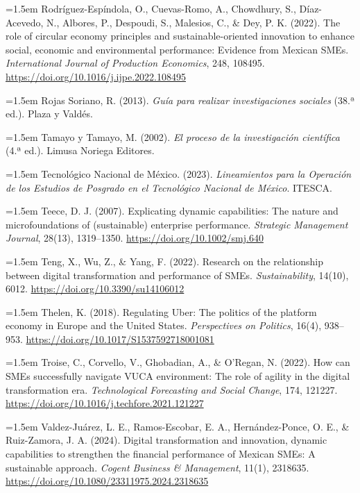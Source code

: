 {\hangindent=1.5em Rodríguez-Espíndola, O., Cuevas-Romo, A., Chowdhury, S., Díaz-Acevedo, N., Albores, P., Despoudi, S., Malesios, C., \& Dey, P. K. (2022). The role of circular economy principles and sustainable-oriented innovation to enhance social, economic and environmental performance: Evidence from Mexican SMEs. \textit{International Journal of Production Economics}, 248, 108495. \url{https://doi.org/10.1016/j.ijpe.2022.108495}

\hangindent=1.5em Rojas Soriano, R. (2013). \textit{Guía para realizar investigaciones sociales} (38.ª ed.). Plaza y Valdés.

\hangindent=1.5em Tamayo y Tamayo, M. (2002). \textit{El proceso de la investigación científica} (4.ª ed.). Limusa Noriega Editores.

\hangindent=1.5em Tecnológico Nacional de México. (2023). \textit{Lineamientos para la Operación de los Estudios de Posgrado en el Tecnológico Nacional de México}. ITESCA.

\hangindent=1.5em Teece, D. J. (2007). Explicating dynamic capabilities: The nature and microfoundations of (sustainable) enterprise performance. \textit{Strategic Management Journal}, 28(13), 1319--1350. \url{https://doi.org/10.1002/smj.640}

\hangindent=1.5em Teng, X., Wu, Z., \& Yang, F. (2022). Research on the relationship between digital transformation and performance of SMEs. \textit{Sustainability}, 14(10), 6012. \url{https://doi.org/10.3390/su14106012}

\hangindent=1.5em Thelen, K. (2018). Regulating Uber: The politics of the platform economy in Europe and the United States. \textit{Perspectives on Politics}, 16(4), 938--953. \url{https://doi.org/10.1017/S1537592718001081}

\hangindent=1.5em Troise, C., Corvello, V., Ghobadian, A., \& O'Regan, N. (2022). How can SMEs successfully navigate VUCA environment: The role of agility in the digital transformation era. \textit{Technological Forecasting and Social Change}, 174, 121227. \url{https://doi.org/10.1016/j.techfore.2021.121227}

\hangindent=1.5em Valdez-Juárez, L. E., Ramos-Escobar, E. A., Hernández-Ponce, O. E., \& Ruiz-Zamora, J. A. (2024). Digital transformation and innovation, dynamic capabilities to strengthen the financial performance of Mexican SMEs: A sustainable approach. \textit{Cogent Business \& Management}, 11(1), 2318635. \url{https://doi.org/10.1080/23311975.2024.2318635}

}
